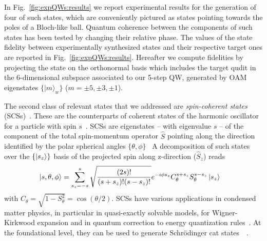 In Fig.~\ref{fig:expQWs:results} we report experimental results for the generation of four of such states, which are conveniently pictured as states pointing towards the poles of a Bloch-like ball. Quantum coherence between the components of such states has been tested by changing their relative phase. The values of the state fidelity between experimentally synthesized states and their respective target ones are reported in Fig.~\ref{fig:expQWs:results}. Hereafter we compute fidelities by projecting the state on the orthonormal basis which includes the target qudit in the 6-dimensional subspace associated to our 5-step \ac{QW}, generated by OAM eigenstates $\{|m\rangle_w\}$ ($m=\pm 5, \pm 3, \pm 1$).

The second class of relevant states that we addressed are \emph{spin-coherent states} (SCSs)~\cite{agarwal1997atomic}. These are the counterparts of coherent states of the harmonic oscillator for a particle with spin $s$~\cite{radcliffe1971some,arecchi1972atomic,agarwal1997atomic,markham2003classicality}. 
SCSs are eigenstates -- with eigenvalue $s$ -- of the component of the total spin-momentum operator $\hat{S}$ pointing along the direction identified by the polar spherical angles $\{ \theta, \phi \}$~\cite{arecchi1972atomic,agarwal1997atomic,ulyanov1999spin,lee2015visualizing} 
A decomposition of such states over the $\{\ket{s_z}\}$ basis of the projected spin along z-direction ($\hat{S}_z$) reads
\begin{equation}
\begin{aligned}
 \ket{s,\theta,\phi} &= \sum_{s_z=-s}^{s}\sqrt{\frac{(2s)!}{(s+s_z)!(s-s_z)!}} e^{-i\phi s_z} C_\theta^{s+s_z}
S_\theta^{s-s_z}\ket{s_z}
 \label{spin_coherent1}
\end{aligned}
   \end{equation}
with $C_\theta=\sqrt{1-S^2_\theta}=\cos(\theta/2)$. SCSs have various applications in condensed matter physics, in particular in quasi-exactly solvable models, for Wigner-Kirkwood expansion and in quantum correction to energy quantization rules~\cite{ulyanov1999spin}. At the foundational level, they can be used to generate Schr{\"o}dinger cat states~~\cite{agarwal1997atomic}. 

